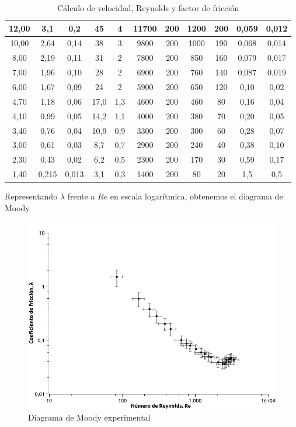 \documentclass[a4paper,12pt,spanish]{article}
\begin{document}
\begin{table}[H]
{\begin{tabular}{|c|c|c|c|c|c|c|c|c|c|c|}
				12,00 & 3,1 & 0,2 & 45 & 4 & 11700 & 200 & 1200 & 200 & 0,059 & 0,012 \\ \hline
				10,00 & 2,64 & 0,14 & 38 & 3 & 9800 & 200 & 1000 & 190 & 0,068 & 0,014 \\ \hline
				8,00 & 2,19 & 0,11 & 31 & 2 & 7800 & 200 & 850 & 160 & 0,079 & 0,017 \\ \hline
				7,00 & 1,96 & 0,10 & 28 & 2 & 6900 & 200 & 760 & 140 & 0,087 & 0,019 \\ \hline
				6,00 & 1,67 & 0,09 & 24 & 2 & 5900 & 200 & 650 & 120 & 0,10 & 0,02 \\ \hline
				4,70 & 1,18 & 0,06 & 17,0 & 1,3 & 4600 & 200 & 460 & 80 & 0,16 & 0,04 \\ \hline
				4,10 & 0,99 & 0,05 & 14,2 & 1,1 & 4000 & 200 & 380 & 70 & 0,20 & 0,05 \\ \hline
				3,40 & 0,76 & 0,04 & 10,9 & 0,9 & 3300 & 200 & 300 & 60 & 0,28 & 0,07 \\ \hline
				3,00 & 0,61 & 0,03 & 8,7 & 0,7 & 2900 & 200 & 240 & 40 & 0,38 & 0,10 \\ \hline
				2,30 & 0,43 & 0,02 & 6,2 & 0,5 & 2300 & 200 & 170 & 30 & 0,59 & 0,17 \\ \hline
				1,40 & 0,215 & 0,013 & 3,1 & 0,3 & 1400 & 200 & 80 & 20 & 1,5 & 0,5 \\ \hline
			\end{tabular}%
		}
		\caption{Cálculo de velocidad, Reynolds y factor de fricción}
		\label{frictionetal}
	\end{table}
	
	
	Representando $\lambda$ frente a $Re$ en escala logarítmica, obtenemos el diagrama de Moody
	
	
\begin{figure}[H]
	\centering
	\includegraphics[width=\linewidth]{../Moody1}
	\caption{Diagrama de Moody experimental}
	\label{fig:moody1}
\end{figure}
\end{document}
